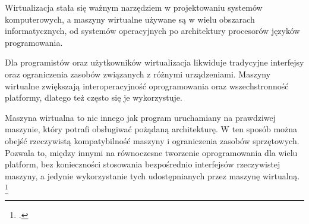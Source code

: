 \par Wirtualizacja stała się ważnym narzędziem w projektowaniu systemów komputerowych, a maszyny wirtualne używane są w wielu obszarach informatycznych, od systemów operacyjnych po architektury procesorów języków programowania.
\par Dla programistów oraz użytkowników wirtualizacja likwiduje tradycyjne interfejsy oraz ograniczenia zasobów związanych z różnymi urządzeniami. Maszyny wirtualne zwiększają interoperacyjność oprogramowania oraz wszechstronność platformy, dlatego też często się je wykorzystuje.
\par Maszyna wirtualna to nic innego jak program uruchamiany na prawdziwej maszynie, który potrafi obsługiwać pożądaną architekturę. W ten sposób można obejść rzeczywistą kompatybilność maszyny i ograniczenia zasobów sprzętowych. Pozwala to, między innymi na równoczesne tworzenie oprogramowania dla wielu platform, bez konieczności stosowania bezpośrednio interfejsów rzeczywistej maszyny, a jedynie wykorzystanie tych udostępnianych przez maszynę wirtualną. \footcite{Smith2005}

